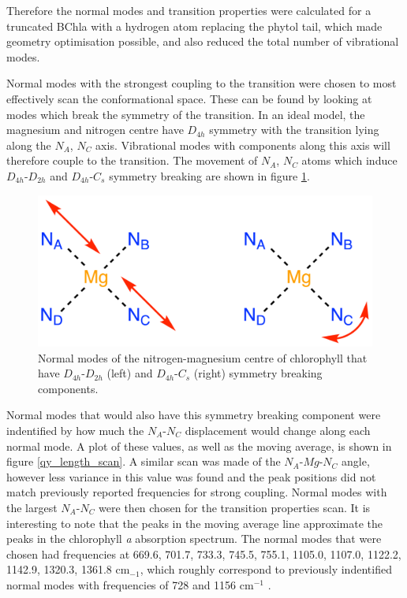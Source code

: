 Therefore the normal modes and transition properties were calculated for a truncated 
BChla with a hydrogen atom replacing the phytol tail, which made geometry optimisation
possible, and also reduced the total number of vibrational modes.

Normal modes with the strongest coupling to the \Qy transition were chosen to most
effectively scan the conformational space. These can be found by looking at modes
which break the symmetry of the \Qy transition. In an ideal model, the magnesium
and nitrogen centre have $D_{4h}$ symmetry with the \Qy transition lying along 
the $N_A$, $N_C$ axis. Vibrational modes with components along this axis will
therefore couple to the transition. The movement of $N_A$, $N_C$ atoms which induce
$D_{4h}$-$D_{2h}$ and $D_{4h}$-$C_{s}$ symmetry breaking are shown in figure \ref{fig:D4_sym_breaking}.

\begin{figure}[h]
    \centering
    \includegraphics[scale=1.5]{chapters/chapter03/D4h_symmetry.png}
    \caption{Normal modes of the nitrogen-magnesium centre of chlorophyll that have
    $D_{4h}$-$D_{2h}$ (left) and $D_{4h}$-$C_{s}$ (right) symmetry breaking components.}
    \label{fig:D4_sym_breaking}
\end{figure}

Normal modes that would also have this symmetry breaking component were indentified
by how much the $N_A$-$N_C$ displacement would change along each normal mode. A plot of these
values, as well as the moving average, is shown in figure \ref{qy_length_scan}.
A similar scan was made of the $N_A$-$Mg$-$N_C$ angle, however less variance in
this value was found and the peak positions did not match previously reported frequencies
for strong coupling. Normal modes with the largest $N_A$-$N_C$ were then chosen 
for the transition properties scan.  It is interesting to note that the peaks in
the moving average line approximate the peaks in the chlorophyll \emph{a} absorption 
spectrum. The normal modes that were chosen had frequencies at 669.6, 701.7, 733.3,
745.5, 755.1, 1105.0, 1107.0, 1122.2, 1142.9, 1320.3, 1361.8 $\text{cm}_{-1}$, which
roughly correspond to previously indentified normal modes with frequencies of 728
and 1156 $\text{cm}^{-1}$ \cite{Kim2020}.

